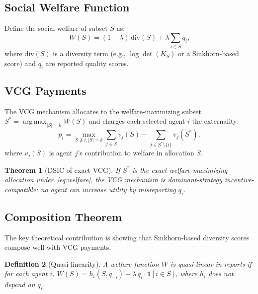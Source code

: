 \documentclass[10pt]{article}
\newtheorem{theorem}{Theorem}
\newtheorem{definition}[theorem]{Definition}
\DeclareMathOperator*{\argmax}{arg\,max}
\begin{document}
\subsection{Social Welfare Function}

Define the social welfare of subset $S$ as:
\begin{equation}
W(S) = (1-\lambda)\, \mathrm{div}(S) + \lambda \sum_{i \in S} q_i,
\label{eq:welfare}
\end{equation}
where $\mathrm{div}(S)$ is a diversity term (e.g., $\log\det(K_S)$ or a Sinkhorn-based score) and $q_i$ are reported quality scores.

\subsection{VCG Payments}

The VCG mechanism allocates to the welfare-maximizing subset $S^* = \argmax_{|S|=k} W(S)$ and charges each selected agent $i$ the externality:
\begin{equation}
p_i = \max_{S \not\ni i, |S|=k} \sum_{j \in S} v_j(S) - \sum_{j \in S^* \setminus \{i\}} v_j(S^*),
\label{eq:vcg-payment}
\end{equation}
where $v_j(S)$ is agent $j$'s contribution to welfare in allocation $S$.

\begin{theorem}[DSIC of exact VCG]
\label{thm:vcg}
If $S^*$ is the exact welfare-maximizing allocation under~\eqref{eq:welfare}, the VCG mechanism is dominant-strategy incentive-compatible: no agent can increase utility by misreporting $q_i$.
\end{theorem}

\subsection{Composition Theorem}

The key theoretical contribution is showing that Sinkhorn-based diversity scores compose well with VCG payments.

\begin{definition}[Quasi-linearity]
\label{def:quasi-linear}
A welfare function $W$ is \emph{quasi-linear in reports} if for each agent $i$,
$W(S) = h_i(S, q_{-i}) + \lambda\, q_i \cdot \mathbf{1}[i \in S]$,
where $h_i$ does not depend on $q_i$.
\end{definition}
\end{document}
